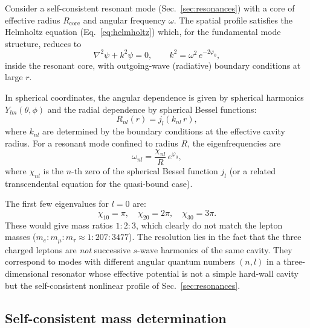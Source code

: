 \documentclass[aps,prd,onecolumn,superscriptaddress,nofootinbib,showpacs,12pt,notitlepage]{revtex4-2}
\begin{document}
Consider a self-consistent resonant mode
(Sec.~\ref{sec:resonances}) with a core of effective radius
$R_{\mathrm{core}}$ and angular frequency $\omega$.  The
spatial profile satisfies the Helmholtz equation
(Eq.~\ref{eq:helmholtz}) which, for the fundamental mode
structure, reduces to
\begin{equation}\label{eq:3d_helmholtz}
  \nabla^{2}\psi + k^{2}\psi = 0,
  \qquad k^{2} = \omega^{2}\,e^{-2\varphi_0},
\end{equation}
inside the resonant core, with outgoing-wave (radiative)
boundary conditions at large $r$.

In spherical coordinates, the angular dependence is given
by spherical harmonics $Y_{lm}(\theta,\phi)$ and the radial
dependence by spherical Bessel functions:
\begin{equation}\label{eq:radial_bessel}
  R_{nl}(r) = j_{l}(k_{nl}\,r),
\end{equation}
where $k_{nl}$ are determined by the boundary conditions
at the effective cavity radius.  For a resonant mode
confined to radius $R$, the eigenfrequencies are
\begin{equation}\label{eq:eigenfreq}
  \omega_{nl} = \frac{\chi_{nl}}{R}\,e^{\varphi_0},
\end{equation}
where $\chi_{nl}$ is the $n$-th zero of the spherical
Bessel function $j_l$ (or a related transcendental equation
for the quasi-bound case).

The first few eigenvalues for $l = 0$ are:
\begin{equation}
  \chi_{10} = \pi, \quad
  \chi_{20} = 2\pi, \quad
  \chi_{30} = 3\pi.
\end{equation}
These would give mass ratios $1:2:3$, which clearly do not
match the lepton masses ($m_e : m_\mu : m_\tau \approx
1 : 207 : 3477$).  The resolution lies in the fact that
the three charged leptons are \emph{not} successive
$s$-wave harmonics of the same cavity.  They correspond
to modes with different angular quantum numbers $(n,l)$
in a three-dimensional resonator whose effective potential
is not a simple hard-wall cavity but the self-consistent
nonlinear profile of Sec.~\ref{sec:resonances}.

\subsection{Self-consistent mass determination}
\label{sec:mass_determination}
\end{document}
